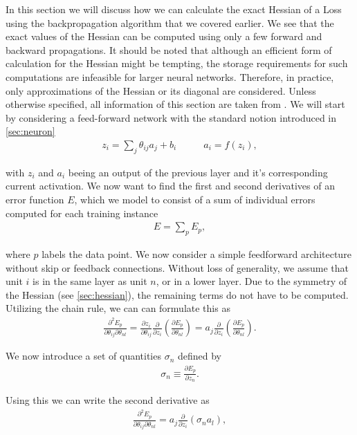 In this section we will discuss how we can calculate the exact Hessian of a Loss using the backpropagation
algorithm that we covered earlier. We see that the exact values of the Hessian can be computed
using only a few forward and backward propagations. It should be noted that although an efficient 
form of calculation for the Hessian might be tempting, the storage requirements for such 
computations are infeasible for larger neural networks. Therefore, in practice, only approximations
of the Hessian or its diagonal are considered.
Unless otherwise specified, all information of this section are taken from \cite{Bishop1992}.
We will start by considering a feed-forward network with the standard notion introduced in \ref{sec:neuron}
\begin{align}                                                                                              
    z_i = \sum_j \theta_{ij} a_j + b_i  \quad &\quad
    a_i = f(z_i),
\end{align}

with $z_i$ and $a_i$ beeing an output of the previous layer and it's corresponding current activation.
We now want to find the first and second derivatives of an error function \(E\), which we model to consist of a sum of individual errors computed for each training instance
\begin{align}
E = \sum_p E_p,
\end{align}

where \(p\) labels the data point. We now consider a simple feedforward architecture without skip
or feedback connections. Without loss of generality, we assume that unit \(i\) is in the same layer
as unit \(n\), or in a lower layer. Due to the symmetry of the Hessian (see \ref{sec:hessian}), the remaining 
terms do not have to be computed. Utilizing the chain rule, we can can formulate this as
\begin{align}
\frac{\partial^2 E_p}{\partial \theta_{ij} \partial \theta_{nl}} = \frac{\partial z_i}{\partial \theta_{ij}} \frac{\partial}{\partial z_i} \left( \frac{\partial E_p}{\partial \theta_{nl}} \right) = a_j \frac{\partial}{\partial z_i} \left( \frac{\partial E_p}{\partial \theta_{nl}} \right).
\end{align}

We now introduce a set of quantities \(\sigma_n\) defined by
\begin{align}
\sigma_n \equiv \frac{\partial E_p}{\partial z_n}.
\end{align}

Using this we can write the second derivative as
\begin{align}
\frac{\partial^2 E_p}{\partial \theta_{ij} \partial \theta_{nl}} = a_j \frac{\partial}{\partial z_i} (\sigma_n a_l),
\end{align}

